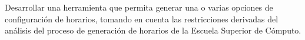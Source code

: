 \label{sec:introduccion}

Desarrollar una herramienta que permita generar una o varias opciones de configuración de horarios, tomando en cuenta
las restricciones derivadas del análisis del proceso de generación de horarios de la Escuela Superior de Cómputo.